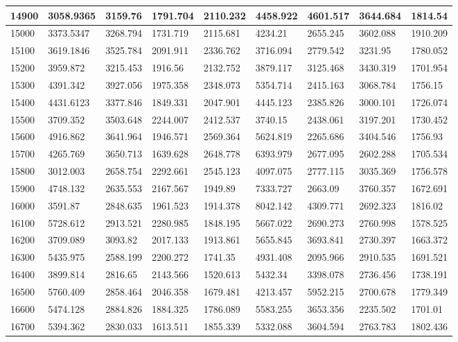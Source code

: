 \begin{table}[]
{\begin{tabular}{|l|l|l|l|l|l|l|l|l|}
14900 & 3058.9365 & 3159.76 & 1791.704 & 2110.232 & 4458.922 & 4601.517 & 3644.684 & 1814.54 \\ \hline
15000 & 3373.5347 & 3268.794 & 1731.719 & 2115.681 & 4234.21 & 2655.245 & 3602.088 & 1910.209 \\ \hline
15100 & 3619.1846 & 3525.784 & 2091.911 & 2336.762 & 3716.094 & 2779.542 & 3231.95 & 1780.052 \\ \hline
15200 & 3959.872 & 3215.453 & 1916.56 & 2132.752 & 3879.117 & 3125.468 & 3430.319 & 1701.954 \\ \hline
15300 & 4391.342 & 3927.056 & 1975.358 & 2348.073 & 5354.714 & 2415.163 & 3068.784 & 1756.15 \\ \hline
15400 & 4431.6123 & 3377.846 & 1849.331 & 2047.901 & 4445.123 & 2385.826 & 3000.101 & 1726.074 \\ \hline
15500 & 3709.352 & 3503.648 & 2244.007 & 2412.537 & 3740.15 & 2438.061 & 3197.201 & 1730.452 \\ \hline
15600 & 4916.862 & 3641.964 & 1946.571 & 2569.364 & 5624.819 & 2265.686 & 3404.546 & 1756.93 \\ \hline
15700 & 4265.769 & 3650.713 & 1639.628 & 2648.778 & 6393.979 & 2677.095 & 2602.288 & 1705.534 \\ \hline
15800 & 3012.003 & 2658.754 & 2292.661 & 2545.123 & 4097.075 & 2777.115 & 3035.369 & 1756.578 \\ \hline
15900 & 4748.132 & 2635.553 & 2167.567 & 1949.89 & 7333.727 & 2663.09 & 3760.357 & 1672.691 \\ \hline
16000 & 3591.87 & 2848.635 & 1961.523 & 1914.378 & 8042.142 & 4309.771 & 2692.323 & 1816.02 \\ \hline
16100 & 5728.612 & 2913.521 & 2280.985 & 1848.195 & 5667.022 & 2690.273 & 2760.998 & 1578.525 \\ \hline
16200 & 3709.089 & 3093.82 & 2017.133 & 1913.861 & 5655.845 & 3693.841 & 2730.397 & 1663.372 \\ \hline
16300 & 5435.975 & 2588.199 & 2200.272 & 1741.35 & 4931.408 & 2095.966 & 2910.535 & 1691.521 \\ \hline
16400 & 3899.814 & 2816.65 & 2143.566 & 1520.613 & 5432.34 & 3398.078 & 2736.456 & 1738.191 \\ \hline
16500 & 5760.409 & 2858.464 & 2046.358 & 1679.481 & 4213.457 & 5952.215 & 2700.678 & 1779.349 \\ \hline
16600 & 5474.128 & 2884.826 & 1884.325 & 1786.089 & 5583.255 & 3653.356 & 2235.502 & 1701.01 \\ \hline
16700 & 5394.362 & 2830.033 & 1613.511 & 1855.339 & 5332.088 & 3604.594 & 2763.783 & 1802.436 \\ \hline

\end{tabular}}
\end{table}
